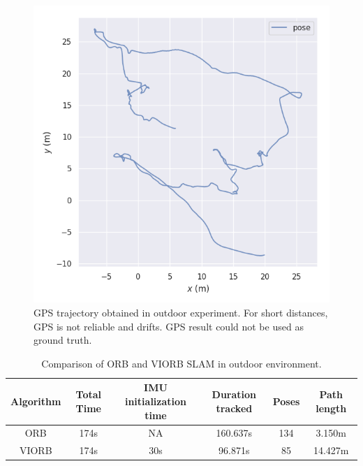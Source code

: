 \begin{figure}[h]
	\centering
	\includegraphics[width=5.5in]{figures/gps_trajectory}
	\caption[Outdoor experiment GPS trajectory]{\small 
	GPS trajectory obtained in outdoor experiment. For short distances, GPS is not reliable and drifts. GPS result could not be used as ground truth.  }
	\label{fig:outdoor-experiment-gps-trajectory}
\end{figure}


\begin{table}[h]
	\caption[Comparison of ORB and VIORB SLAM in outdoor environment.]{\small Comparison of ORB and VIORB SLAM in outdoor environment.}
	\begin{tabular}{|c|c|c|c|c|c|}
		\hline 
		Algorithm & Total Time & IMU initialization time & Duration tracked & Poses & Path length \\ \hline \hline
		ORB & 174s & NA & 160.637s  & 134 & 3.150m  \\ \hline
		VIORB & 174s & 30s & 96.871s & 85 & 14.427m \\ \hline
	\end{tabular}
	\label{tab:outdoor-comparision}
\end{table} 

\FloatBarrier

